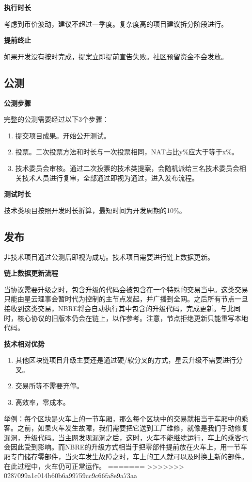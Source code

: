 
\textbf{执行时长}

考虑到币价波动，建议不超过一季度。复杂度高的项目建议拆分阶段进行。

\textbf{提前终止}

如果开发没有按时完成，提案立即提前宣告失败。社区预留资金不会发放。

\subsection{公测}
\textbf{公测步骤}

完整的公测需要经过以下3个步骤：
\begin{enumerate}
\item 提交项目成果。开始公开测试。
\item 投票。二次投票方法和时长与一次投票相同，NAT占比y\%应大于等于x\%。
\item 技术委员会审核。通过二次投票的技术类提案，会随机派给三名技术委员会相关技术人员进行复审，全部通过即视为通过，进入发布流程。
\end{enumerate}

\textbf{测试时长}

技术类项目按照开发时长折算，最短时间为开发周期的10\%。

\subsection{发布}
非技术项目通过公测后即视为成功。技术项目需要进行链上数据更新。

\textbf{链上数据更新流程}

当协议需要升级之时，包含升级的代码会被包含在一个特殊的交易当中。这类交易只能由星云理事会暂时代为控制的主节点发起，并广播到全网。之后所有节点一旦接收到这类交易，NBRE将会自动执行其中包含的升级代码，完成更新。与此同时，核心协议的旧版本仍会在链上，以作参考。注意，节点拒绝更新只能重写本地代码。

\textbf{技术相对优势}
\begin{enumerate}
	\item 其他区块链项目升级主要还是通过硬/软分叉的方式，星云升级不需要进行分叉。
\item 交易所等不需要充停。
\item 高效率，零成本。
\end{enumerate}

举例：每个区块是火车上的一节车厢，那么每个区块中的交易就相当于车厢中的乘客。之前，如果火车发生故障，我们需要把它送到工厂维修，就像是我们手动修复漏洞，升级代码。当主网发现漏洞之后，这时，火车不能继续运行，车上的乘客也会因此受到影响。而NBRE的升级方式相当于把零部件提前放在火车上，用一节车厢专门储存零部件，当火车发生故障之时，车上的工人就可以及时换上新的部件。在此过程中，火车仍可正常运作。
=======
>>>>>>> 0287099a1c014b60b6a99759cc9c66fa8e9a73aa



